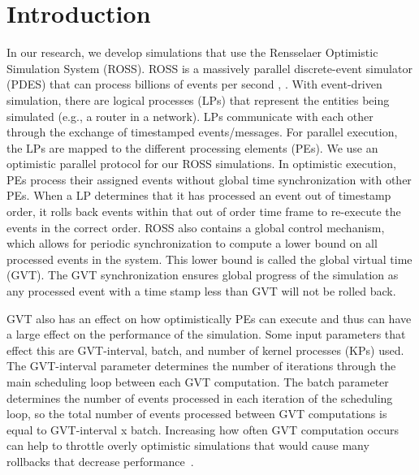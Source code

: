 \documentclass{acm_proc_article-sp}
\begin{document}
\maketitle
%
%

%
%


%
%

%
%






\section{Introduction}
In our research, we develop simulations that use the Rensselaer Optimistic Simulation System (ROSS).  ROSS is a massively parallel discrete-event simulator (PDES) that can process billions of events per second \cite{Holder}, \cite{Bauer}.  With event-driven simulation, there are logical processes (LPs) that represent the entities being simulated (e.g., a router in a network). LPs communicate with each other through the exchange of timestamped events/messages.  For parallel execution, the LPs are mapped to the different processing elements (PEs). We use an optimistic parallel protocol for our ROSS simulations.  In optimistic execution, PEs process their assigned events without global time synchronization with other PEs.  When a LP determines that it has processed an event out of timestamp order, it rolls back events within that out of order time frame to re-execute the events in the correct order.  ROSS also contains a global control mechanism, which allows for periodic synchronization to compute a lower bound on all processed events in the system.  This lower bound is called the global virtual time (GVT).  The GVT synchronization ensures global progress of the simulation as any processed event with a time stamp less than GVT will not be rolled back. 

GVT also has an effect on how optimistically PEs can execute and thus can have a large effect on the performance of the simulation. Some input parameters that effect this are GVT-interval, batch, and number of kernel processes (KPs) used. The GVT-interval parameter determines the number of iterations through the main scheduling loop between each GVT computation.  The batch parameter determines the number of events processed in each iteration of the scheduling loop, so the total number of events processed between GVT computations is equal to GVT-interval x batch.  Increasing how often GVT computation occurs can help to throttle overly optimistic simulations that would cause many rollbacks that decrease performance~\cite{carothers}.  
\end{document}
